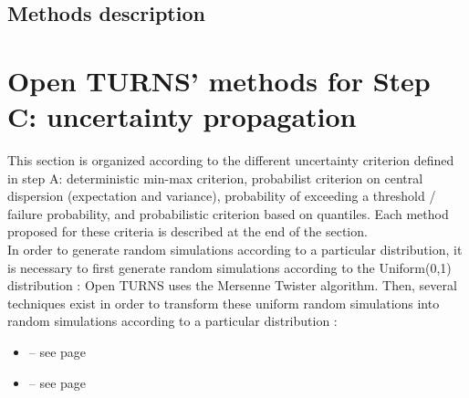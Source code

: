 \newpage

\subsection{Methods description}


\newpage

\newpage

\newpage

\newpage

\newpage

\newpage

\newpage

\newpage

\newpage

\newpage

\newpage

\newpage

\newpage

\newpage

% 
\newpage

\newpage

\newpage

\newpage

\newpage

\newpage

\newpage

\section{Open TURNS' methods for Step C: uncertainty propagation}

This section is organized according to the different uncertainty criterion defined in step A: deterministic min-max criterion, probabilist criterion on central dispersion (expectation and variance), probability of exceeding a threshold / failure probability, and probabilistic criterion based on quantiles. Each method proposed for these criteria is described at the end of the section. \\

In order to generate random simulations according to a particular distribution, it is necessary to first generate random simulations according to the Uniform(0,1) distribution : Open TURNS uses the Mersenne Twister algorithm. Then, several techniques exist in order to transform these uniform random simulations into random simulations according to a particular distribution :

\begin{itemize}

\item {} -- see page \pageref{docref_C_UniformRandomGenerator} \vspace{2mm}
\item {} -- see page \pageref{docref_C_DistributionRealisations} \vspace{2mm}

\end{itemize}

